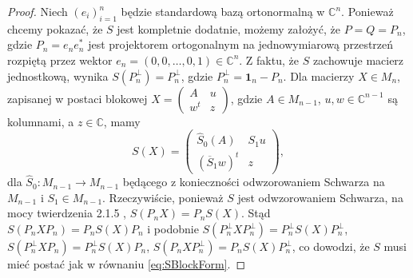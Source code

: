\begin{proof}
Niech $(e_{i})_{i=1}^{n}$
będzie standardową bazą ortonormalną w $\mathbb{C}^{n}$.
Ponieważ chcemy pokazać, że $S$ jest kompletnie dodatnie,
możemy założyć, że $P = Q = P_{n}$,
gdzie $P_{n} = e_{n} e_{n}^{*}$ jest projektorem ortogonalnym na jednowymiarową
przestrzeń rozpiętą przez wektor $e_{n} = (0,0,\ldots,0,1) \in \mathbb{C}^{n}$.
Z faktu, że $S$ zachowuje macierz jednostkową, wynika
$S(P_{n}^{\perp}) = P_{n}^{\perp}$,
gdzie $P_{n}^{\perp} = \mathbf{1}_{n} - P_{n}$.
Dla macierzy $X \in M_{n}$,
zapisanej w postaci blokowej
$X = \left( \begin{smallmatrix} A & u \\ w^{t} & z \end{smallmatrix} \right)$,
gdzie $A \in M_{n-1}$, $u, w \in \mathbb{C}^{n-1}$ są kolumnami, a
$z \in \mathbb{C}$, mamy
\begin{equation}
\label{eq:SBlockForm}
    S (X) = \begin{pmatrix}
        \hat{S}_{0}(A) & S_{1} u \\
        (\overline{S}_{1} w)^{t} & z
    \end{pmatrix},
\end{equation}
dla $\hat{S}_{0}: M_{n-1} \rightarrow M_{n-1}$ będącego z konieczności
odwzorowaniem Schwarza na $M_{n-1}$ i $S_{1} \in M_{n-1}$.
Rzeczywiście, ponieważ $S$ jest odwzorowaniem Schwarza,
na mocy twierdzenia 2.1.5 \cite{Stormer2013},
$S(P_{n} X) = P_{n} S(X)$.
Stąd
$S(P_{n} X P_{n}) = P_{n} S(X) P_{n}$ i podobnie
$S(P_{n}^{\perp} X P_{n}^{\perp}) = P_{n}^{\perp} S(X) P_{n}^{\perp}$,
$S(P_{n}^{\perp} X P_{n}) = P_{n}^{\perp} S(X) P_{n}$,
$S(P_{n} X P_{n}^{\perp}) = P_{n} S(X) P_{n}^{\perp}$,
co dowodzi, że $S$ musi mieć postać jak w równaniu \eqref{eq:SBlockForm}.


\end{proof}
